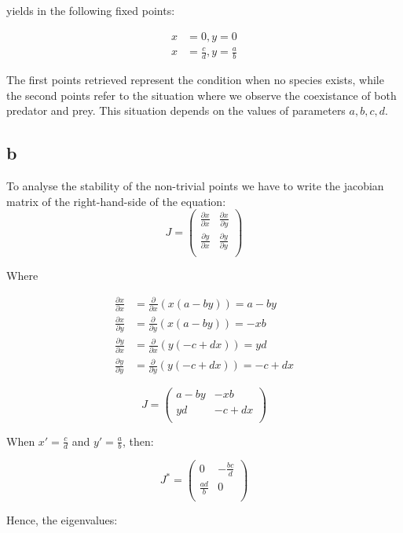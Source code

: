 yields in the following fixed points:
 
\begin{align*}
x &= 0, y =0 \\
x &= \frac{c}{d} , y = \frac{a}{b}
\end{align*}

The first points retrieved represent the condition when no species exists, while the second points refer to the situation where we observe the coexistance of both predator and prey. This situation depends on the values of parameters $a,b,c,d$.

\subsection{b}

To analyse the stability of the non-trivial points we have to write the jacobian matrix of the right-hand-side of the equation:
\[J = \begin{pmatrix}
\frac{\partial x}{\partial x} & \frac{\partial x}{\partial y}\\
\frac{\partial y}{\partial x} & \frac{\partial y}{\partial y}\\
\end{pmatrix}\]

Where 

\begin{align*}
\frac{\partial x}{\partial x}  &= \frac{\partial}{\partial x}(x(a-by)) = a-by\\
\frac{\partial x}{\partial y}  &= \frac{\partial}{\partial y}(x(a-by)) = -xb\\
\frac{\partial y}{\partial x}  &= \frac{\partial}{\partial x}(y(-c+dx)) = yd\\
\frac{\partial y}{\partial y}  &= \frac{\partial}{\partial y}(y(-c+dx)) = -c+dx
\end{align*}

\[J = \begin{pmatrix}
a-by & -xb\\
yd & -c+dx\\
\end{pmatrix}\]

When $x'= \frac{c}{d}$ and $y'=\frac{a}{b}$, then:

\[J^*= \begin{pmatrix}
0 & -\frac{bc}{d}\\
\frac{ad}{b} & 0\\
\end{pmatrix}\]

Hence, the eigenvalues:

